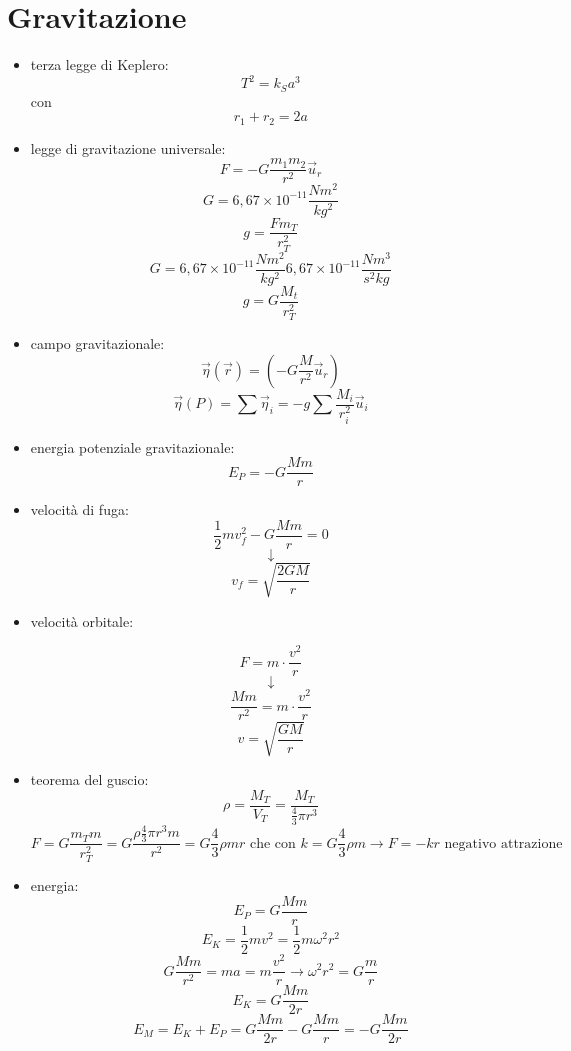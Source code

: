 \documentclass[a4paper,12pt, oneside]{book}
\begin{document}
\section{Gravitazione}
\begin{itemize}
\item terza legge di Keplero: 
$$T^2=k_Sa^3$$
con 
$$r_1+r_2=2a$$
\item legge di gravitazione universale:
$$F=-G\frac{m_1m_2}{r^2}\vec{u}_r$$
$$G=6,67 \times 10^{−11} \frac{N m^2}{kg^2}$$
$$g=\frac{Fm_T}{r_T^2}$$
$$G=6,67\times10^{-11}\frac{Nm^2}{kg^2}6,67\times10^{-11}\frac{Nm^3}{s^2kg}$$
$$g=G\frac{M_t}{r_T^2}$$
\item campo gravitazionale:
$$\vec{\eta}(\vec{r})=\left(-G\frac{M}{r^2}\vec{u}_r\right)$$
$$\vec{\eta}(P)=\sum \vec{\eta}_i=-g\sum \frac{M_i}{r_i^2}\vec{u}_i$$
\item energia potenziale gravitazionale:
$$E_P=-G\frac{Mm}{r}$$
\item velocità di fuga:
$$\frac{1}{2}mv_f^2-G\frac{Mm}{r}=0$$
$$\downarrow$$
$$v_f=\sqrt{\frac{2GM}{r}}$$
\item velocità orbitale:

$$F=m\cdot \frac{v^2}{r}$$
$$\downarrow$$
$$\frac{Mm}{r^2}=m\cdot \frac{v^2}{r}$$
$$v=\sqrt{\frac{GM}{r}}$$
\item teorema del guscio:
$$\rho=\frac{M_T}{V_T}=\frac{M_T}{\frac{4}{3}\pi r^3}$$
$$F=G\frac{m_Tm}{r_T^2}=G\frac{\rho\frac{4}{3}\pi r^3 m}{r^2}=G\frac{4}{3}\rho m r \mbox{ che con } k=G\frac{4}{3}\rho m \to F=-kr \mbox{ negativo attrazione}$$
\item energia:
$$E_P=G\frac{Mm}{r}$$
$$E_K=\frac{1}{2}mv^2=\frac{1}{2}m\omega^2r^2$$
$$G\frac{Mm}{r^2}=ma=m\frac{v^2}{r}\to\omega^2r^2=G\frac{m}{r}$$
$$E_K=G\frac{Mm}{2r}$$
$$E_M=E_K+E_P=G\frac{Mm}{2r}-G\frac{Mm}{r}=-G\frac{Mm}{2r}$$
\end{itemize}
\end{document}
